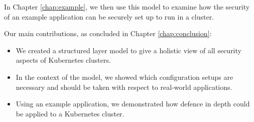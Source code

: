 In Chapter \ref{chap:example}, we then use this model to examine how the security of an example application can be securely set up to run in a cluster.

Our main contributions, as concluded in Chapter \ref{chap:conclusion}:

\begin{itemize}
	\item We created a structured layer model to give a holistic view of all security aspects of Kubernetes clusters.
	\item In the context of the model, we showed which configuration setups are necessary and should be taken with respect to real-world applications.
	\item Using an example application, we demonstrated how defence in depth could be applied to a Kubernetes cluster.
\end{itemize}



